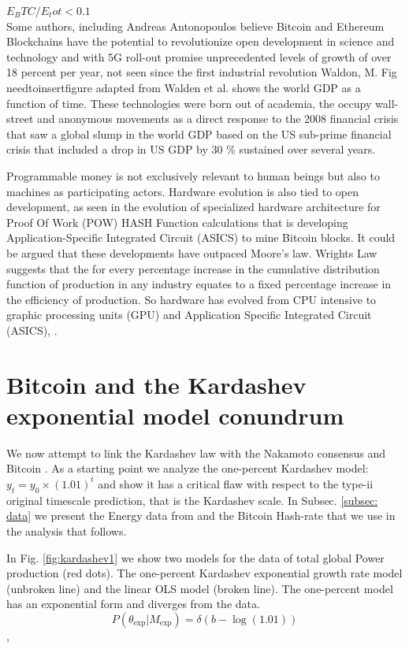 \documentclass[final,5p,times,twocolumn,authoryear]{elsarticle}
\begin{document}
$E_BTC/E_tot < 0.1$
\\
 Some authors, including Andreas Antonopoulos believe Bitcoin and Ethereum Blockchains have the potential to revolutionize open development in science and technology and with 5G roll-out promise unprecedented levels of growth of over 18 percent per year, not seen since the first industrial revolution Waldon, M.  Fig needtoinsertfigure adapted from Walden et al. shows the world GDP as a function of time. These technologies were born out of academia, the occupy wall-street and anonymous movements as a direct response to the 2008 financial crisis that saw a global slump in the world GDP based on the US sub-prime financial crisis  that included a drop in US GDP by 30 \% sustained over several years.
 
Programmable money is not exclusively relevant to human beings but also to machines as participating actors. Hardware evolution is also tied to open development, as seen in the evolution of specialized hardware architecture for Proof Of Work (POW) HASH Function calculations that is developing Application-Specific Integrated Circuit (ASICS) to mine Bitcoin blocks. It could be argued that these developments have outpaced Moore's law.  Wrights Law suggests that the for every percentage increase in the cumulative distribution function of production in any industry equates to a fixed percentage increase in the efficiency of production. So hardware has evolved from CPU intensive to graphic processing units (GPU) and  Application Specific Integrated Circuit  (ASICS), \cite{10.1371/journal.pone.0052669}.

\section{Bitcoin and the Kardashev exponential model conundrum}
\label{sec:energy}

We now attempt to link the Kardashev law  \cite{kar64} with the Nakamoto consensus and Bitcoin \cite{nak2009}. As a starting point we analyze the one-percent Kardashev model: $y_t = y_0 \times (1.01)^t$
 and show it has a critical flaw with respect to the type-ii original timescale prediction, that is the Kardashev scale. In Subsec. \ref{subsec: data} we present the Energy data from \cite{owidenergy} and the Bitcoin Hash-rate that we use in the analysis that follows. 

In Fig. \ref{fig:kardashev1} we show two models for the data of total global Power production (red dots). The one-percent Kardashev exponential growth rate model (unbroken line) and the linear OLS model (broken line). The one-percent model has an exponential form and diverges from the data.
$$P(\theta_{\text{exp}} | M_{\text{exp}}) = \delta(b - \log(1.01))$$,
\end{document}
